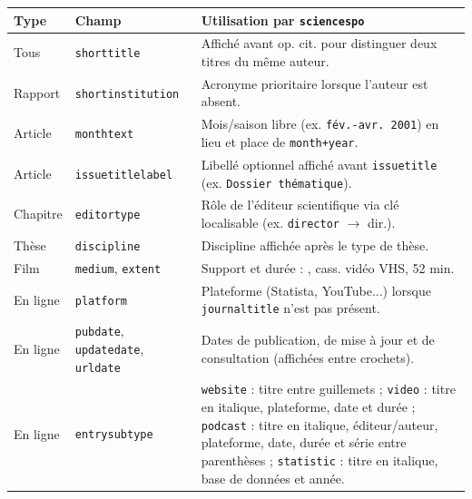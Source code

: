 \documentclass{article}
\begin{document}
\begin{table}[h]
	\centering
	\begin{tabular}{@{}llp{8cm}@{}}
		\toprule
		Type     & Champ                                                   & Utilisation par \texttt{sciencespo}                                                                          \\
		\midrule
		Tous     & \texttt{shorttitle}                                     & Affiché avant op. cit. pour distinguer deux titres du même auteur.                                           \\
		Rapport  & \texttt{shortinstitution}                               & Acronyme prioritaire lorsque l'auteur est absent.                                                            \\
		Article  & \texttt{monthtext}                                      & Mois/saison libre (ex. \texttt{fév.-avr. 2001}) en lieu et place de \texttt{month+year}.                     \\
		Article  & \texttt{issuetitlelabel}                                & Libellé optionnel affiché avant \texttt{issuetitle} (ex. \texttt{Dossier thématique}).                       \\
		Chapitre & \texttt{editortype}                                     & Rôle de l'éditeur scientifique via clé localisable (ex. \texttt{director} \(\rightarrow\) \og dir.\fg{}). \\
		Thèse    & \texttt{discipline}                                     & Discipline affichée après le type de thèse.                                                                  \\
		Film     & \texttt{medium}, \texttt{extent}                        & Support et durée : \og [cassette vidéo]\fg{}, \og 1 cass. vidéo VHS, 52 min.\fg{}                            \\
		En ligne & \texttt{platform}                                       & Plateforme (Statista, YouTube...) lorsque \texttt{journaltitle} n'est pas présent.                           \\
		En ligne & \texttt{pubdate}, \texttt{updatedate}, \texttt{urldate} & Dates de publication, de mise à jour et de consultation (affichées entre crochets).                          \\
			En ligne & \texttt{entrysubtype}                                   & \texttt{website} : titre entre guillemets ; \texttt{video} : titre en italique, plateforme, date et durée ; \texttt{podcast} : titre en italique, éditeur/auteur, plateforme, date, durée et série entre parenthèses ; \texttt{statistic} : titre en italique, base de données et année. \\
		\bottomrule
	\end{tabular}
\end{table}
\end{document}
